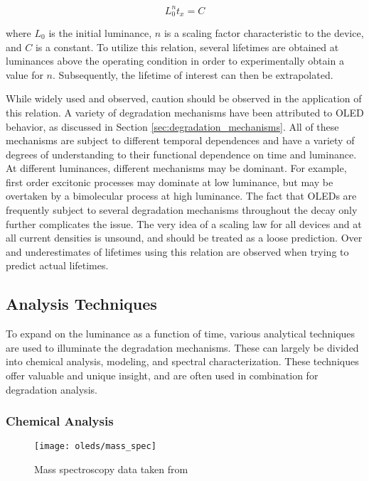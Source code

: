 \documentclass[../thesis.tex]{subfiles}
\begin{document}
\begin{equation}
L_0^n t_x=C
\label{eqn:luminance_scaling}
\end{equation}

where $L_0$ is the initial luminance, $n$ is a scaling factor characteristic to the device, and $C$ is a constant.
To utilize this relation, several lifetimes are obtained at luminances above the operating condition in order to experimentally obtain a value for $n$.
Subsequently, the lifetime of interest can then be extrapolated.

While widely used and observed, caution should be observed in the application of this relation.  
A variety of degradation mechanisms have been attributed to OLED behavior, as discussed in Section \ref{sec:degradation_mechanisms}.
All of these mechanisms are subject to different temporal dependences and have a variety of degrees of understanding to their functional dependence on time and luminance.
At different luminances, different mechanisms may be dominant.
For example, first order excitonic processes may dominate at low luminance, but may be overtaken by a bimolecular process at high luminance.
The fact that OLEDs are frequently subject to several degradation mechanisms throughout the decay only further complicates the issue.
The very idea of a scaling law for all devices and at all current densities is unsound, and should be treated as a loose prediction.
Over and underestimates of lifetimes using this relation are observed when trying to predict actual lifetimes.\supercite{Meerheim2006,Fry2005}


\subsection{Analysis Techniques}\label{sec:degradation_analysis}

To expand on the luminance as a function of time, various analytical techniques are used to illuminate the degradation mechanisms.
These can largely be divided into chemical analysis, modeling, and spectral characterization.
These techniques offer valuable and unique insight, and are often used in combination for degradation analysis.

\subsubsection{Chemical Analysis}

\begin{figure}[ht]
\centering
\texttt{[image: oleds/mass\_spec]}
\caption{Mass spectroscopy data taken from \textcite{Seifert2013b}}
\label{fig:oleds_mass_spec}
\end{figure}
\end{document}
